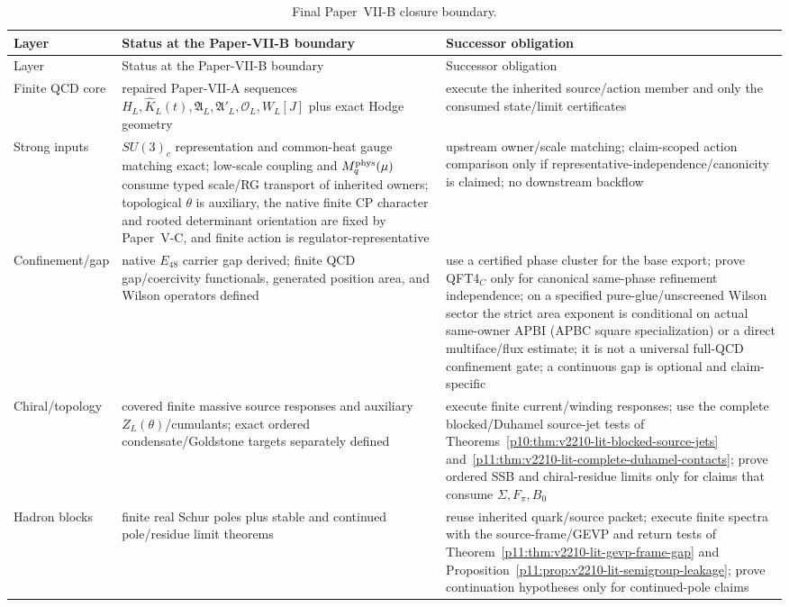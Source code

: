 \documentclass[12pt,a4paper]{article}
\begin{document}
\begin{longtable}{>{\raggedright\arraybackslash}p{} >{\raggedright\arraybackslash}p{} >{\raggedright\arraybackslash}p{}}
\caption[Final Paper-VII-B closure boundary]{Final Paper~VII-B closure boundary.}\label{p11:tab:final-closure-boundary}\\
\toprule
Layer & Status at the Paper-VII-B boundary & Successor obligation \\
\midrule
\endfirsthead
\toprule
Layer & Status at the Paper-VII-B boundary & Successor obligation \\
\midrule
\endhead
Finite QCD core & repaired Paper-VII-A sequences \(H_L,\widehat K_L(t),\mathfrak A_L,\mathfrak A'_L,\mathcal O_L,W_L[J]\) plus exact Hodge geometry & execute the inherited source/action member and only the consumed state/limit certificates \\
Strong inputs & \(SU(3)_c\) representation and common-heat gauge matching exact; low-scale coupling and \(M_q^{\rm phys}(\mu)\) consume typed scale/RG transport of inherited owners; topological \(\theta\) is auxiliary, the native finite CP character and rooted determinant orientation are fixed by Paper~V-C, and finite action is regulator-representative & upstream owner/scale matching; claim-scoped action comparison only if representative-independence/canonicity is claimed; no downstream backflow \\
Confinement/gap & native \(E_{48}\) carrier gap derived; finite QCD gap/coercivity functionals, generated position area, and Wilson operators defined & use a certified phase cluster for the base export; prove QFT4$_C$ only for canonical same-phase refinement independence; on a specified pure-glue/unscreened Wilson sector the strict area exponent is conditional on actual same-owner APBI (APBC square specialization) or a direct multiface/flux estimate; it is not a universal full-QCD confinement gate; a continuous gap is optional and claim-specific \\
Chiral/topology & covered finite massive source responses and auxiliary \(Z_L(\theta)\)/cumulants; exact ordered condensate/Goldstone targets separately defined & execute finite current/winding responses; use the complete blocked/Duhamel source-jet tests of Theorems~\ref{p10:thm:v2210-lit-blocked-source-jets} and~\ref{p11:thm:v2210-lit-complete-duhamel-contacts}; prove ordered SSB and chiral-residue limits only for claims that consume \(\Sigma,F_\pi,B_0\) \\
Hadron blocks & finite real Schur poles plus stable and continued pole/residue limit theorems & reuse inherited quark/source packet; execute finite spectra with the source-frame/GEVP and return tests of Theorem~\ref{p11:thm:v2210-lit-gevp-frame-gap} and Proposition~\ref{p11:prop:v2210-lit-semigroup-leakage}; prove continuation hypotheses only for continued-pole claims \\

\end{longtable}
\end{document}
